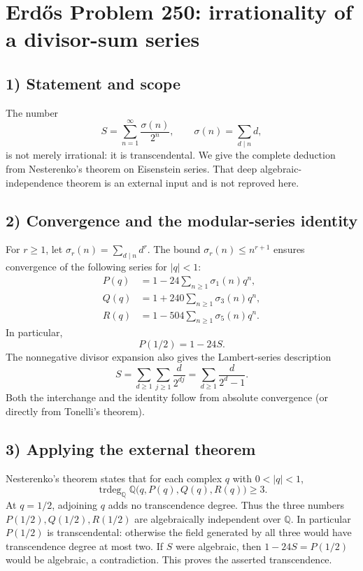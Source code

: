 \section{Erd\H{o}s Problem 250: irrationality of a divisor-sum series}

\subsection{1) Statement and scope}
The number
\[
 S=\sum_{n=1}^{\infty}\frac{\sigma(n)}{2^n},
 \qquad \sigma(n)=\sum_{d\mid n}d,
\]
is not merely irrational: it is transcendental.
We give the complete deduction from Nesterenko's theorem on
Eisenstein series. That deep algebraic-independence theorem
is an external input and is not reproved here.

\subsection{2) Convergence and the modular-series identity}
For $r\geq1$, let $\sigma_r(n)=\sum_{d\mid n}d^r$.
The bound $\sigma_r(n)\leq n^{r+1}$ ensures convergence
of the following series for $|q|<1$:
\[
 \begin{split}
 P(q)&=1-24\sum_{n\geq1}\sigma_1(n)q^n,\\
 Q(q)&=1+240\sum_{n\geq1}\sigma_3(n)q^n,\\
 R(q)&=1-504\sum_{n\geq1}\sigma_5(n)q^n.
 \end{split}
\]
In particular,
\[
 P(1/2)=1-24S.
\]
The nonnegative divisor expansion also gives the Lambert-series
description
\[
 S=\sum_{d\geq1}\sum_{j\geq1}\frac{d}{2^{dj}}
  =\sum_{d\geq1}\frac{d}{2^d-1}.
\]
Both the interchange and the identity follow from absolute
convergence (or directly from Tonelli's theorem).

\subsection{3) Applying the external theorem}
Nesterenko's theorem states that for each complex $q$ with
$0<|q|<1$,
\[
 \operatorname{trdeg}_{\mathbb Q}
       \mathbb Q\bigl(q,P(q),Q(q),R(q)\bigr)\geq3.
\]
At $q=1/2$, adjoining $q$ adds no transcendence degree.
Thus the three numbers $P(1/2),Q(1/2),R(1/2)$ are algebraically
independent over $\mathbb Q$. In particular $P(1/2)$ is
transcendental: otherwise the field generated by all three
would have transcendence degree at most two.
If $S$ were algebraic, then $1-24S=P(1/2)$ would be algebraic,
a contradiction. This proves the asserted transcendence.

